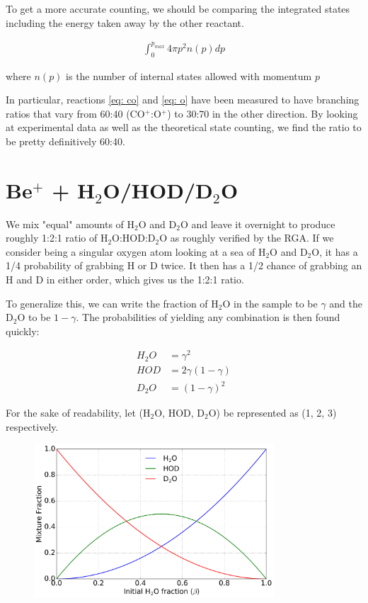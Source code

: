 \documentclass[a4paper]{article}
\begin{document}
To get a more accurate counting, we should be comparing the integrated states including the energy taken away by the other reactant.

\begin{align}
\int_0^{p_{max}}4\pi p^2 n(p) dp
\end{align}

where $n(p)$ is the number of internal states allowed with momentum $p$


In particular, reactions \ref{eq: co} and \ref{eq: o} have been measured to have branching ratios that vary from 60:40 (CO$^+$:O$^+$) to 30:70 in the other direction. By looking at experimental data as well as the theoretical state counting, we find the ratio to be pretty definitively 60:40.

\section{Be$^+$ + H$_2$O/HOD/D$_2$O}

We mix "equal" amounts of H$_2$O and D$_2$O and leave it overnight to produce roughly 1:2:1 ratio of H$_2$O:HOD:D$_2$O as roughly verified by the RGA. If we consider being a singular oxygen atom looking at a sea of H$_2$O and D$_2$O, it has a 1/4 probability of grabbing H or D twice. It then has a 1/2 chance of grabbing an H and D in either order, which gives us the 1:2:1 ratio.

To generalize this, we can write the fraction of H$_2$O in the sample to be $\gamma$ and the D$_2$O to be $1-\gamma$. The probabilities of yielding any combination is then found quickly:

\begin{align}
H_2O& = \gamma^2 \\
HOD& = 2\gamma(1-\gamma) \\
D_2O& = (1-\gamma)^2
\end{align}

For the sake of readability, let (H$_2$O, HOD, D$_2$O) be represented as (1, 2, 3) respectively.

\begin{figure}[H]
\label{fig: mixture}
\centering
\includegraphics[width=0.8\textwidth]{behod_isotopologues.png}
\caption{}
\end{figure}
\end{document}
